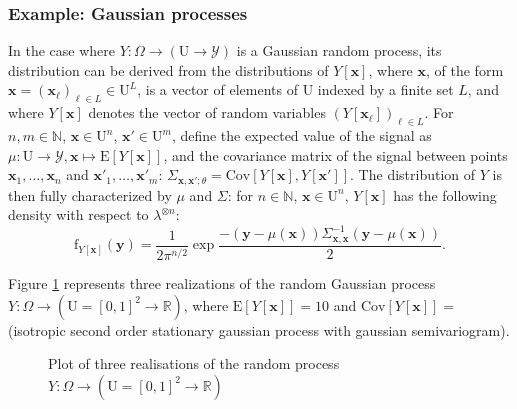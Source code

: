\documentclass[12pt]{article}
\theoremstyle{definition}
\theoremstyle{remark}
\newcommand{\dominantY}{\lambda}
\newcommand{\parampop}{\theta}
\newcommand{\provar}{\Sigma}
\newcommand{\Cov}{\mathrm{Cov}}
\newcommand{\density}{\mathrm{f}}
\newcommand{\Pop}{\mathrm{U}}
\newcommand{\position}{\mathbf{x}}
\newcommand{\Sampleindex}{L}
\newcommand{\SignalSpace}{\mathscr{Y}}
\newcommand{\Signal}{Y}
\newcommand{\signal}{\mathbf{y}}
\begin{document}
\subsubsection*{Example: Gaussian processes}
In the case where $\Signal:\Omega\to(\Pop\to\SignalSpace)$ is a   Gaussian random process, its distribution  can be derived from the distributions of $\Signal[\position]$, where $\position$, of the form $\position=(\position_\ell)_{\ell\in \Sampleindex}\in\Pop^\Sampleindex$, is a vector of elements of $\Pop$ indexed by a finite set $\Sampleindex$, and where $Y[\position]$ denotes the vector of random variables $(Y[\position_\ell])_{\ell\in \Sampleindex}$. 
For $n,m\in\mathbb{N}$, $\position\in\Pop^n$, $\position'\in\Pop^m$, define the expected value of the signal as $\mu:\Pop\to\SignalSpace,\position\mapsto\mathrm{E}\left[\Signal[\position]\right]$, and the covariance matrix of the signal between points $\position_1,\ldots,\position_n$ and $\position'_1,\ldots,\position'_m$: $\provar_{\position,\position';\parampop}=\Cov \left[\Signal[\position],\Signal[\position']\right]$.
The distribution of $\Signal$ is then fully characterized by $\mu$ and $\provar$: for $n\in\mathbb{N}$,   $\position\in\Pop^n$, $\Signal[\position]$ has the following density with respect to $\dominantY^{\otimes n}$: 
\begin{equation} \label{eq:pdf_norm_process}
    \density_{\Signal[\position]}\left(\signal\right)=\frac{1}{2\pi^{n/2}}\exp{\frac{-(\signal-\mu(\position))\provar_{\position,\position}^{-1}(\signal-\mu(\position))}{2}}.
\end{equation}
%

Figure \ref{fig:oaijsfdoij} represents three realizations of the random Gaussian process $\Signal:\Omega\to(\Pop=[0,1]^2\to\mathbb{R})$, where 
$\mathrm{E}[\Signal[\position]]=10$ and 
$\mathrm{Cov}[\Signal[\position]]=$
(isotropic second order stationary gaussian process with 
gaussian semivariogram).
\begin{figure}[H]
\hspace{-.6cm}
    
    \vspace{-1cm}
    \caption{Plot of three realisations of the random process $\Signal:\Omega\to(\Pop=[0,1]^2\to\mathbb{R})$}
    \label{fig:oaijsfdoij}
\end{figure}
\end{document}
